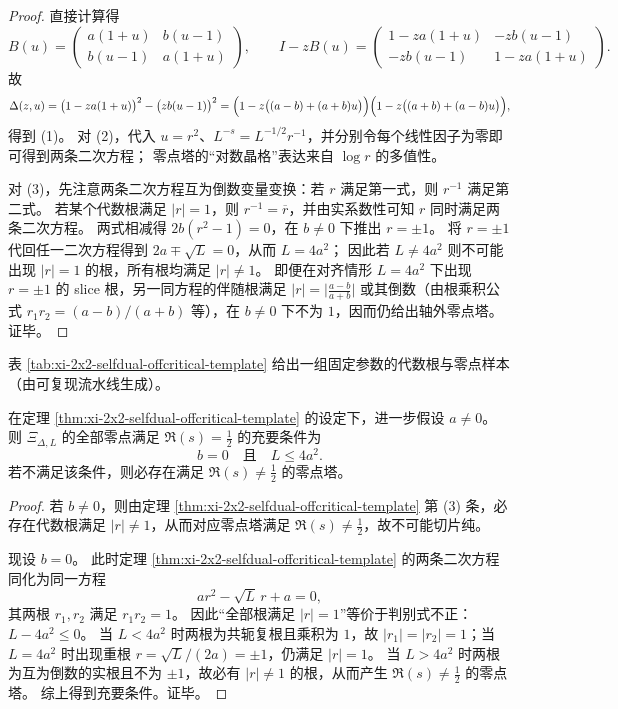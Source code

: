 \begin{proof}
直接计算得
\[
B(u)=\begin{pmatrix}a(1+u)&b(u-1)\\ b(u-1)&a(1+u)\end{pmatrix},
\qquad
I-zB(u)=
\begin{pmatrix}1-za(1+u)&-zb(u-1)\\ -zb(u-1)&1-za(1+u)\end{pmatrix}.
\]
故
\[
\Delta(z,u)
=\bigl(1-za(1+u)\bigr)^2-\bigl(zb(u-1)\bigr)^2
=\Bigl(1-z\bigl((a-b)+(a+b)u\bigr)\Bigr)\Bigl(1-z\bigl((a+b)+(a-b)u\bigr)\Bigr),
\]
得到 (1)。
对 (2)，代入 \(u=r^2\)、\(L^{-s}=L^{-1/2}r^{-1}\)，并分别令每个线性因子为零即可得到两条二次方程；
零点塔的“对数晶格”表达来自 \(\log r\) 的多值性。
\par
对 (3)，先注意两条二次方程互为倒数变量变换：若 \(r\) 满足第一式，则 \(r^{-1}\) 满足第二式。
若某个代数根满足 \(|r|=1\)，则 \(r^{-1}=\overline r\)，并由实系数性可知 \(r\) 同时满足两条二次方程。
两式相减得 \(2b(r^2-1)=0\)，在 \(b\neq 0\) 下推出 \(r=\pm 1\)。
将 \(r=\pm 1\) 代回任一二次方程得到 \(2a\mp\sqrt L=0\)，从而 \(L=4a^2\)；
因此若 \(L\neq 4a^2\) 则不可能出现 \(|r|=1\) 的根，所有根均满足 \(|r|\neq 1\)。
即便在对齐情形 \(L=4a^2\) 下出现 \(r=\pm 1\) 的 slice 根，另一同方程的伴随根满足
\(
|r|=\bigl|\frac{a-b}{a+b}\bigr|
\)
或其倒数（由根乘积公式 \(r_1r_2=(a-b)/(a+b)\) 等），在 \(b\neq 0\) 下不为 \(1\)，因而仍给出轴外零点塔。
证毕。
\end{proof}

表 \ref{tab:xi-2x2-selfdual-offcritical-template} 给出一组固定参数的代数根与零点样本（由可复现流水线生成）。


\begin{corollary}[最小自对偶桥接核的切片纯度充要条件]\label{cor:xi-2x2-selfdual-slice-purity-iff}
在定理 \ref{thm:xi-2x2-selfdual-offcritical-template} 的设定下，进一步假设 \(a\neq 0\)。
则 \(\Xi_{\Delta,L}\) 的全部零点满足 \(\Re(s)=\tfrac12\) 的充要条件为
\[
b=0\quad\text{且}\quad L\le 4a^2.
\]
若不满足该条件，则必存在满足 \(\Re(s)\neq\tfrac12\) 的零点塔。
\end{corollary}

\begin{proof}
若 \(b\neq 0\)，则由定理 \ref{thm:xi-2x2-selfdual-offcritical-template} 第 (3) 条，必存在代数根满足 \(|r|\neq 1\)，从而对应零点塔满足 \(\Re(s)\neq\tfrac12\)，故不可能切片纯。
\par
现设 \(b=0\)。
此时定理 \ref{thm:xi-2x2-selfdual-offcritical-template} 的两条二次方程同化为同一方程
\[
a r^2-\sqrt L\,r+a=0,
\]
其两根 \(r_1,r_2\) 满足 \(r_1r_2=1\)。
因此“全部根满足 \(|r|=1\)”等价于判别式不正：
\(
L-4a^2\le 0
\)。
当 \(L<4a^2\) 时两根为共轭复根且乘积为 \(1\)，故 \(|r_1|=|r_2|=1\)；当 \(L=4a^2\) 时出现重根 \(r=\sqrt L/(2a)=\pm 1\)，仍满足 \(|r|=1\)。
当 \(L>4a^2\) 时两根为互为倒数的实根且不为 \(\pm 1\)，故必有 \(|r|\neq 1\) 的根，从而产生 \(\Re(s)\neq\tfrac12\) 的零点塔。
综上得到充要条件。证毕。
\end{proof}

